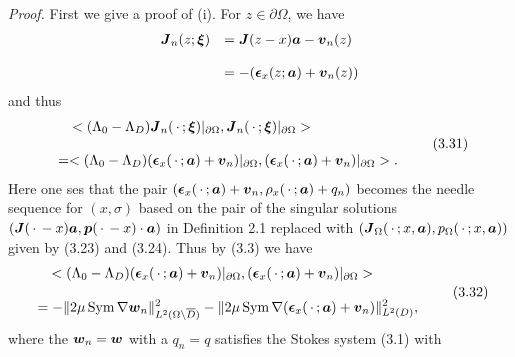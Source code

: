  \endproclaim
{\it\noindent Proof.}  First we give a proof of (i).
For $z\in\partial\Omega$, we have
$$\begin{array}{ll}
\displaystyle
\mbox{\boldmath $J$}_n(z;\mbox{\boldmath $\xi$})
&
\displaystyle
=\mbox{\boldmath $J$}(z-x)\mbox{\boldmath $a$}-\mbox{\boldmath $v$}_n(z)
\\
\\
\displaystyle
&
\displaystyle
=-(\mbox{\boldmath $\epsilon$}_x(z;\mbox{\boldmath $a$})+\mbox{\boldmath $v$}_n(z))
\end{array}
$$
and thus
$$\begin{array}{l}
\displaystyle
\,\,\,\,\,\,
<(\Lambda_0-\Lambda_D)\mbox{\boldmath $J$}_n(\,\cdot\,;\mbox{\boldmath $\xi$})\vert_{\partial\Omega},
\mbox{\boldmath $J$}_n(\,\cdot\,;\mbox{\boldmath $\xi$})\vert_{\partial\Omega}>
\\
\\
\displaystyle
=<(\Lambda_0-\Lambda_D)
(\mbox{\boldmath $\epsilon$}_x(\,\cdot\,;\mbox{\boldmath $a$})+\mbox{\boldmath $v$}_n)
\vert_{\partial\Omega},
(\mbox{\boldmath $\epsilon$}_x(\,\cdot\,;\mbox{\boldmath $a$})+\mbox{\boldmath $v$}_n)
\vert_{\partial\Omega}>.
\end{array}
\tag {3.31}
$$
Here one ses that the pair 
$(\mbox{\boldmath $\epsilon$}_x(\,\cdot\,;\mbox{\boldmath $a$})+\mbox{\boldmath $v$}_n,\rho_x(\,\cdot\,;\mbox{\boldmath $a$})+q_n)$
becomes the needle sequence for $(x,\sigma)$ based on the pair of the singular solutions $(\mbox{\boldmath $J$}(\,\cdot\,-x)\mbox{\boldmath $a$},\mbox{\boldmath $p$}(\,\cdot\,-x)\cdot\mbox{\boldmath $a$})$ in Definition 2.1 replaced with
$(\mbox{\boldmath $J$}_{\Omega}(\,\cdot\,;x,\mbox{\boldmath $a$}),p_{\Omega}(\,\cdot\,;x,\mbox{\boldmath $a$}))$ given by (3.23) and (3.24).
Thus by (3.3) we have
$$\begin{array}{l}
\displaystyle
\,\,\,\,\,\,
<(\Lambda_0-\Lambda_D)
(\mbox{\boldmath $\epsilon$}_x(\,\cdot\,;\mbox{\boldmath $a$})+\mbox{\boldmath $v$}_n)
\vert_{\partial\Omega},
(\mbox{\boldmath $\epsilon$}_x(\,\cdot\,;\mbox{\boldmath $a$})+\mbox{\boldmath $v$}_n)
\vert_{\partial\Omega}>
\\
\\
\displaystyle
=-\Vert 2\mu\,\text{Sym}\,\nabla\mbox{\boldmath $w$}_n\Vert_{L^2(\Omega\setminus\overline{D})}^2
-\Vert 2\mu\,\text{Sym}\,\nabla(\mbox{\boldmath $\epsilon$}_x(\,\cdot
\,;\mbox{\boldmath $a$})+\mbox{\boldmath $v$}_n)
\Vert_{L^2(D)}^2,
\end{array}
\tag {3.32}
$$
where the $\mbox{\boldmath $w$}_n=\mbox{\boldmath $w$}$ with a $q_n=q$ satisfies the Stokes system (3.1) with 

